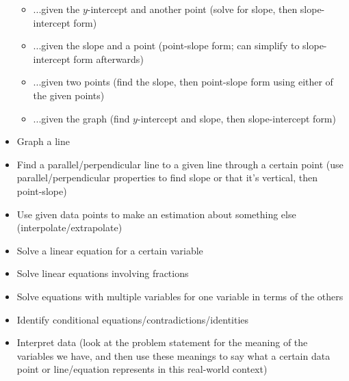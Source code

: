 \documentclass{article}
\begin{document}
\begin{itemize}
\begin{itemize}
        \item ...given the $y$-intercept and another point (solve for slope, then slope-intercept form)
        \item ...given the slope and a point (point-slope form; can simplify to slope-intercept form afterwards)
        \item ...given two points (find the slope, then point-slope form using either of the given points)
        \item ...given the graph (find $y$-intercept and slope, then slope-intercept form)
    \end{itemize}
    \item Graph a line
    \item Find a parallel/perpendicular line to a given line through a certain point (use parallel/perpendicular properties to find slope or that it's vertical, then point-slope)
    \item Use given data points to make an estimation about something else (interpolate/extrapolate)
    \item Solve a linear equation for a certain variable
    \item Solve linear equations involving fractions
    \item Solve equations with multiple variables for one variable in terms of the others
    \item Identify conditional equations/contradictions/identities
    \item Interpret data (look at the problem statement for the meaning of the variables we have, and then use these meanings to say what a certain data point or line/equation represents in this real-world context)
\end{itemize}
\end{document}
